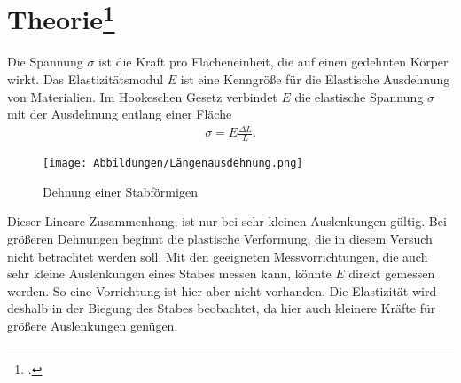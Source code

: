 \section[Theorie]{Theorie\footcite{man:v103}}
Die Spannung $\sigma$ ist die Kraft pro Flächeneinheit, die auf einen gedehnten Körper wirkt.
Das Elastizitätsmodul $E$ ist eine Kenngröße für die Elastische Ausdehnung von Materialien. %
Im Hookeschen Gesetz verbindet $E$ die elastische Spannung $\sigma$ mit der Ausdehnung entlang einer Fläche
\begin{align}
    \sigma = E \frac{\Delta L}{L}.
    \label{eq:Hook_Gesetz}
\end{align}
\begin{figure}
    \texttt{[image: Abbildungen/Längenausdehnung.png]}
    \caption{Dehnung einer Stabförmigen }
    \label{fig:laengenausdehnung}
\end{figure}
Dieser Lineare Zusammenhang, ist nur bei sehr kleinen Auslenkungen gültig.
Bei größeren Dehnungen beginnt die plastische Verformung, die in diesem Versuch nicht betrachtet werden soll.
Mit den geeigneten Messvorrichtungen, die auch sehr kleine Auslenkungen eines Stabes messen kann, 
könnte $E$ direkt gemessen werden.
So eine Vorrichtung ist hier aber nicht vorhanden. 
Die Elastizität wird deshalb in der Biegung des Stabes beobachtet, da hier auch kleinere Kräfte für größere Auslenkungen genügen.


